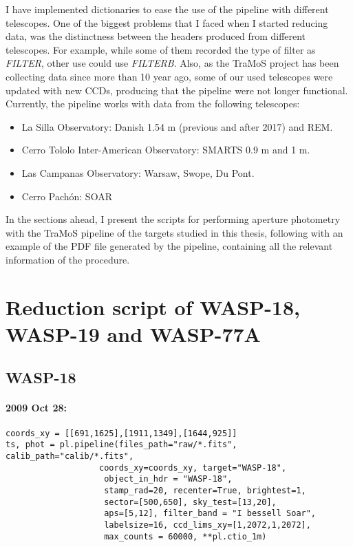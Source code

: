 I have implemented dictionaries to ease the use of the pipeline with different telescopes. One of the biggest problems that I faced when I started reducing data, was the distinctness between the headers produced from different telescopes. For example, while some of them recorded the type of filter as \textit{FILTER}, other use could use \textit{FILTERB}. Also, as the TraMoS project has been collecting data since more than 10 year ago, some of our used telescopes were updated with new CCDs, producing that the pipeline were not longer functional. Currently, the pipeline works with data from the following telescopes: 
\begin{itemize}
\item La Silla Observatory: Danish 1.54 m (previous and after 2017) and REM.
\item Cerro Tololo Inter-American Observatory: SMARTS 0.9 m and 1 m.
\item Las Campanas Observatory: Warsaw, Swope, Du Pont.
\item Cerro Pachón: SOAR
\end{itemize}

In the sections ahead, I present the scripts for performing aperture photometry with the TraMoS pipeline of the targets studied in this thesis, following with an example of the PDF file generated by the pipeline, containing all the relevant information of the procedure.

\section{Reduction script of WASP-18, WASP-19 and WASP-77A}
\subsection*{WASP-18}
\paragraph*{2009 Oct 28:}
\begin{verbatim}
coords_xy = [[691,1625],[1911,1349],[1644,925]]
ts, phot = pl.pipeline(files_path="raw/*.fits", calib_path="calib/*.fits", 
				   coords_xy=coords_xy, target="WASP-18",
                    object_in_hdr = "WASP-18",
                    stamp_rad=20, recenter=True, brightest=1,
                    sector=[500,650], sky_test=[13,20],
                    aps=[5,12], filter_band = "I bessell Soar",
                    labelsize=16, ccd_lims_xy=[1,2072,1,2072],
                    max_counts = 60000, **pl.ctio_1m)
\end{verbatim}

